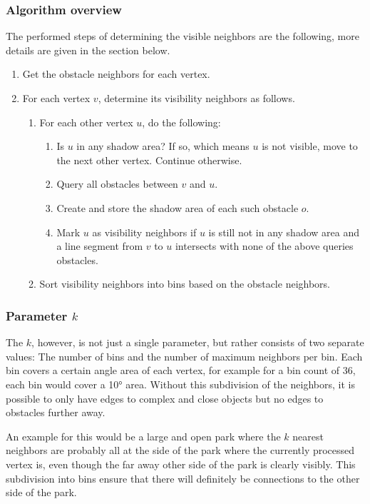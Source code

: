 			\subsubsection{Algorithm overview}
			
				The performed steps of determining the visible neighbors are the following, more details are given in the section below.
				\begin{enumerate}
					\item Get the obstacle neighbors for each vertex.
					\item For each vertex $v$, determine its visibility neighbors as follows.
					\begin{enumerate}
						\item For each other vertex $u$, do the following:
						\begin{enumerate}
							\item Is $u$ in any shadow area? If so, which means $u$ is not visible, move to the next other vertex. Continue otherwise.
							\item Query all obstacles between $v$ and $u$.
							\item Create and store the shadow area of each such obstacle $o$.
							\item Mark $u$ as visibility neighbors if $u$ is still not in any shadow area and a line segment from $v$ to $u$ intersects with none of the above queries obstacles.
						\end{enumerate}
						\item Sort visibility neighbors into bins based on the obstacle neighbors.
					\end{enumerate}
				\end{enumerate}
			
			\subsubsection{Parameter $k$}
			
				The $k$, however, is not just a single parameter, but rather consists of two separate values:
				The number of bins and the number of maximum neighbors per bin.
				Each bin covers a certain angle area of each vertex, for example for a bin count of 36, each bin would cover a 10° area.
				Without this subdivision of the neighbors, it is possible to only have edges to complex and close objects but no edges to obstacles further away.
				
				An example for this would be a large and open park where the $k$ nearest neighbors are probably all at the side of the park where the currently processed vertex is, even though the far away other side of the park is clearly visibly.
				This subdivision into bins ensure that there will definitely be connections to the other side of the park.
			
